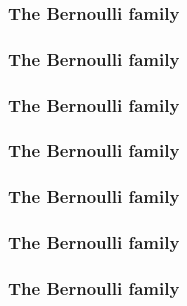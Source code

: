 \begin{frame}[fragile]\frametitle{The Bernoulli family}


\end{frame}

\begin{frame}[fragile]\frametitle{The Bernoulli family}



\end{frame}

\begin{frame}[fragile]\frametitle{The Bernoulli family}



\end{frame}

\begin{frame}[fragile]\frametitle{The Bernoulli family}



\end{frame}

\begin{frame}[fragile]\frametitle{The Bernoulli family}



\end{frame}

\begin{frame}[fragile]\frametitle{The Bernoulli family}



\end{frame}

\begin{frame}[fragile]\frametitle{The Bernoulli family}



\end{frame}


